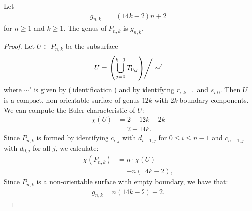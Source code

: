 \begin{lem}
\label{lem:genera}
Let
\begin{align*}
    g_{n,k} &= (14k - 2)n + 2
\end{align*} for $n \geq 1$ and $k \geq 1$.
    The genus of $P_{n,k}$ is $g_{n,k}$.
\end{lem}
\begin{proof}
  Let $U \subset P_{n,k}$ be the subsurface
  \begin{align*}
    U = \left. \left( \bigcup_{j =0}^{k-1} T_{0,j} \right)\right/\sim'
  \end{align*}
  where $\sim'$ is given by (\ref{identification}) and by identifying $r_{i,k-1}$ and $s_{i,0}$.
  Then $U$ is a compact, non-orientable surface of genus $12k$ with $2k$ boundary components.  %
  We can compute the Euler characteristic of $U$: %
  \begin{align*}
    \chi(U) &= 2 - 12k - 2k \\
            &= 2 - 14k.
  \end{align*}
  Since $P_{n,k}$ is formed by identifying $c_{i,j}$ with $d_{i+1,j}$ for $0\leq i\leq n-1$ and $c_{n-1,j}$ with $d_{0,j}$ for all $j$, we calculate:
  \begin{align*}
    \chi(P_{n,k}) &= n \cdot \chi(U)\\
                  &= -n(14k - 2),
  \end{align*}
  Since $P_{n,k}$ is a non-orientable surface with empty boundary, we have that:
  \begin{align*}
    g_{n,k} = n(14k-2) + 2.
  \end{align*}
\end{proof}

